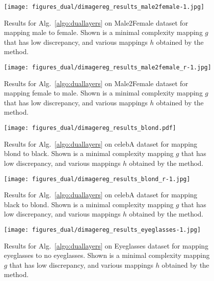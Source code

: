 \documentclass{article} %
\begin{document}
\begin{figure}[t]
  \centering
\texttt{[image: figures\_dual/dimagereg\_results\_male2female-1.jpg]}
  \caption{\label{fig:alg9} Results for Alg.~\ref{algo:duallayers} on Male2Female dataset for mapping male to female. Shown is a minimal complexity mapping $g$ that has low discrepancy, and various mappings $h$ obtained by the method.}
\end{figure}

\begin{figure}[t]
  \centering
\texttt{[image: figures\_dual/dimagereg\_results\_male2female\_r-1.jpg]}
  \caption{\label{fig:alg10} Results for Alg.~\ref{algo:duallayers} on Male2Female dataset for mapping female to male. Shown is a minimal complexity mapping $g$ that has low discrepancy, and various mappings $h$ obtained by the method.}
\end{figure}


\begin{figure}[t]
  \centering
\texttt{[image: figures\_dual/dimagereg\_results\_blond.pdf]}
  \caption{\label{fig:alg1} Results for Alg.~\ref{algo:duallayers} on celebA dataset for mapping blond to black. Shown is a minimal complexity mapping $g$ that has low discrepancy, and various mappings $h$ obtained by the method.}
\end{figure}


\begin{figure}[t]
  \centering
\texttt{[image: figures\_dual/dimagereg\_results\_blond\_r-1.jpg]}
  \caption{\label{fig:alg2} Results for Alg.~\ref{algo:duallayers} on celebA dataset for mapping black to blond. Shown is a minimal complexity mapping $g$ that has low discrepancy, and various mappings $h$ obtained by the method.}

\end{figure}



\begin{figure}[t]
  \centering
\texttt{[image: figures\_dual/dimagereg\_results\_eyeglasses-1.jpg]}
  \caption{\label{fig:alg7} Results for Alg.~\ref{algo:duallayers} on Eyeglasses dataset for mapping eyeglasses to no eyeglasses. Shown is a minimal complexity mapping $g$ that has low discrepancy, and various mappings $h$ obtained by the method.}
\end{figure}
\end{document}
